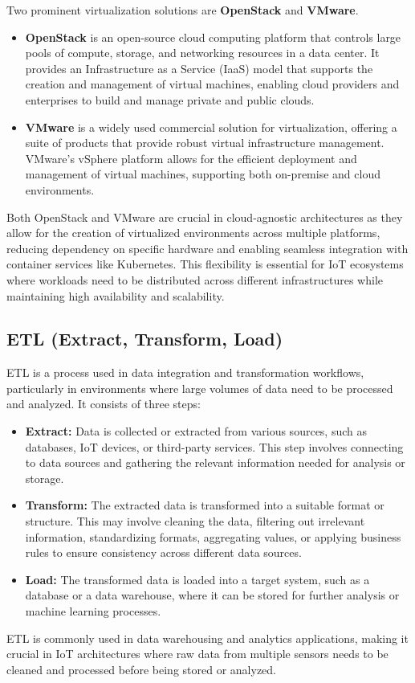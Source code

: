 Two prominent virtualization solutions are \textbf{OpenStack}\cite{site:openstack} and \textbf{VMware}\cite{site:vmware}.

\begin{itemize}
    \item \textbf{OpenStack} is an open-source cloud computing platform that controls large pools of compute, storage, and networking resources in a data center. It provides an Infrastructure as a Service (IaaS) model that supports the creation and management of virtual machines, enabling cloud providers and enterprises to build and manage private and public clouds.
    \item \textbf{VMware} is a widely used commercial solution for virtualization, offering a suite of products that provide robust virtual infrastructure management. VMware’s vSphere platform allows for the efficient deployment and management of virtual machines, supporting both on-premise and cloud environments.
\end{itemize}

Both OpenStack and VMware are crucial in cloud-agnostic architectures as they allow for the creation of virtualized environments across multiple platforms, reducing dependency on specific hardware and enabling seamless integration with container services like Kubernetes. This flexibility is essential for IoT ecosystems where workloads need to be distributed across different infrastructures while maintaining high availability and scalability.


\subsection*{ETL (Extract, Transform, Load)}
\label{sec:etl}
ETL is a process used in data integration and transformation workflows, particularly in environments where large volumes of data need to be processed and analyzed. It consists of three steps:
\begin{itemize}
    \item \textbf{Extract:} Data is collected or extracted from various sources, such as databases, IoT devices, or third-party services. This step involves connecting to data sources and gathering the relevant information needed for analysis or storage.
    \item \textbf{Transform:} The extracted data is transformed into a suitable format or structure. This may involve cleaning the data, filtering out irrelevant information, standardizing formats, aggregating values, or applying business rules to ensure consistency across different data sources.
    \item \textbf{Load:} The transformed data is loaded into a target system, such as a database or a data warehouse, where it can be stored for further analysis or machine learning processes.
\end{itemize}
ETL is commonly used in data warehousing and analytics applications, making it crucial in IoT architectures where raw data from multiple sensors needs to be cleaned and processed before being stored or analyzed. 

